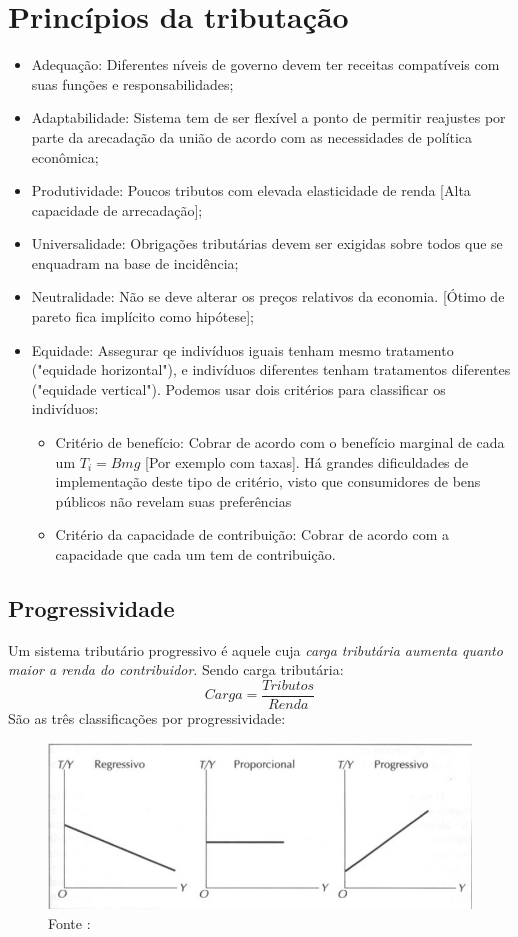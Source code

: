\documentclass[12pt,a4paper,oneside,brazil]{abntex2}
\begin{document}
\section{Princípios da tributação}
\begin{itemize}
\item Adequação: Diferentes níveis de governo devem ter receitas compatíveis com suas funções e responsabilidades; 
\item Adaptabilidade: Sistema tem de ser flexível a ponto de permitir reajustes por parte da arecadação da união de acordo com as necessidades de política econômica;
\item Produtividade: Poucos tributos com elevada elasticidade de renda [Alta capacidade de arrecadação];
\item Universalidade: Obrigações tributárias devem ser exigidas sobre todos que se enquadram na base de incidência;
\item Neutralidade: Não se deve alterar os preços relativos da economia. [Ótimo de pareto fica implícito como hipótese];
\item Equidade: Assegurar qe indivíduos iguais tenham mesmo tratamento ("equidade horizontal"), e indivíduos diferentes tenham tratamentos diferentes ("equidade vertical"). Podemos usar dois critérios para classificar os indivíduos:
\begin{itemize}
\item Critério de benefício: Cobrar de acordo com o benefício marginal de cada um $ T_i = Bmg$ [Por exemplo com taxas]. Há grandes dificuldades de implementação deste tipo de critério, visto que consumidores de bens públicos não revelam suas preferências 
\item Critério da capacidade de contribuição: Cobrar de acordo com a capacidade que cada um tem de contribuição.
\end{itemize}
\end{itemize}

\subsection{Progressividade}
Um sistema tributário progressivo é aquele cuja \emph{carga tributária aumenta quanto maior a renda do contribuidor}. Sendo carga tributária:
\begin{equation} \label{Carga Tributária}
Carga = \frac{Tributos}{Renda}
\end{equation}
São as três classificações por progressividade:

\begin{figure}[h]
\centering
\includegraphics[scale=0.7]{Progressividade.png}
\caption{Fonte : \cite[p. 165]{rezende}}
\end{figure}
\end{document}
